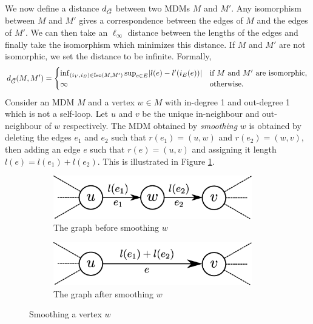 We now define a distance $d_{\vec{G}}$ between two MDMs $M$ and $M'$.  Any isomorphism between $M$ and $M'$ gives a correspondence between the edges of $M$ and the edges of $M'$. We can then take an $\ell_{\infty}$ distance between the lengths of the edges and finally take the isomorphism which minimizes this distance. If $M$ and $M'$ are not isomorphic, we set the distance to be infinite. Formally,
\begin{equation*}
    d_{\vec{G}}(M, M') = \begin{cases}
        \inf_{(i_V, i_E) \in \operatorname{Iso}(M, M')} \sup_{e \in E} \lvert l(e) - l'(i_E(e))\rvert & \text{if $M$ and $M'$ are isomorphic,} \\
        \infty & \text{otherwise.}
    \end{cases}
\end{equation*}
Consider an MDM $M$ and a vertex $w \in M$ with in-degree 1 and out-degree 1 which is not a self-loop. Let $u$ and $v$ be the unique in-neighbour and out-neighbour of $w$ respectively. The MDM obtained by \emph{smoothing} $w$ is obtained by deleting the edges $e_1$ and $e_2$ such that $r(e_1) = (u, w)$ and $r(e_2) = (w, v)$, then adding an edge $e$ such that $r(e) = (u, v)$ and assigning it length $l(e) = l(e_1) + l(e_2)$. This is illustrated in Figure \ref{fig:smoothing}. 
\begin{figure}[htbp]
    \centering
    \begin{subfigure}[htbp]{0.45\textwidth}
        \centering
        \includegraphics[width=0.95\textwidth]{Content/Pictures/Fig4a.eps}
        \caption{The graph before smoothing $w$}
    \end{subfigure}
    \hfill
    \begin{subfigure}[htbp]{0.45\textwidth}
        \centering
        \includegraphics[width=0.95\textwidth]{Content/Pictures/Fig4b.eps}
        \caption{The graph after smoothing $w$}
    \end{subfigure}
    \caption{Smoothing a vertex $w$}
    \label{fig:smoothing}
\end{figure}

